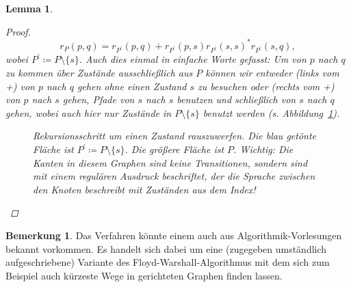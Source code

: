 \documentclass[11pt, a4paper]{article}
\theoremstyle{definition}
\newtheorem*{remark*}{Bemerkung}
\theoremstyle{plain}
\newtheorem{lemma}[definition]{Lemma}
\numberwithin{equation}{section}
\begin{document}
\begin{lemma}
\begin{proof}
		\[
			r_P(p, q) = r_{P^\prime}(p, q) + r_{P^\prime}(p, s) r_{P^\prime}(s, s)^\ast r_{P^\prime}(s, q),
		\]
wobei \( P^\prime \coloneqq P \setminus \{ s \} \). Auch dies einmal in einfache Worte gefasst: Um von \( p \) nach \( q \) zu kommen über Zustände ausschließlich aus \( P \) können wir entweder (links vom +) von \( p \) nach \( q \) gehen ohne einen Zustand \( s \) zu besuchen oder (rechts vom +) von \( p \) nach \( s \) gehen, Pfade von \( s \) nach \( s \) benutzen und schließlich von \( s \) nach \( q \) gehen, wobei auch hier nur Zustände in \( P \setminus \{ s \} \) benutzt werden (s. Abbildung~\ref{fig:state_elimination}).
		\begin{figure}
			\centering
			
			\caption{Rekursionsschritt um einen Zustand rauszuwerfen. Die blau getönte Fläche ist \( P^\prime \coloneqq P \setminus \{ s \} \). Die größere Fläche ist \( P \). Wichtig: Die Kanten in diesem Graphen sind keine Transitionen, sondern sind mit einem regulären Ausdruck beschriftet, der die Sprache zwischen den Knoten beschreibt mit Zuständen aus dem Index!}
			\label{fig:state_elimination}
		\end{figure}
	\end{proof}
\end{lemma}
\begin{remark*}
	Das Verfahren könnte einem auch aus Algorithmik-Vor\-le\-sung\-en bekannt vorkommen. Es handelt sich dabei um eine (zugegeben umständlich aufgeschriebene) Variante des Floyd-Warshall-Algorithmus mit dem sich zum Beispiel auch kürzeste Wege in gerichteten Graphen finden lassen.
\end{remark*}
\end{document}
